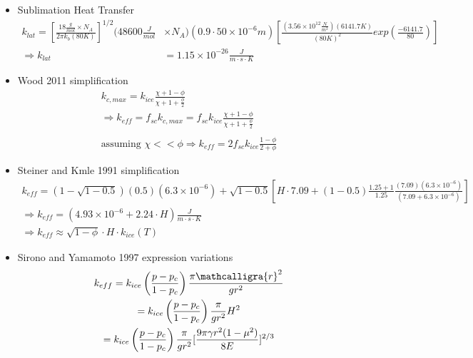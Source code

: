 \documentclass[11pt]{article} %
\newcommand{\sr}{\ensuremath{\mathcalligra{r}} \xspace}
\begin{document}
\begin{itemize}
\begin{itemize}
\item Sublimation Heat Transfer
	\begin{equation}
	\begin{split}
	k_{lat} = [ \frac{18 \frac{g}{mol} \times N_{A}}{2 \pi k_{b} (80K)} ]^{1/2} (48600 \frac{J}{mol} & \times N_{A})(0.9 \cdot 50\times10^{-6} m) [ \frac{(3.56\times 10^{12} \frac{N}{m^{2}})(6141.7 K)}{(80 K)^{2}} exp( \frac{-6141.7}{80} ) ] \\
	\Rightarrow k_{lat} &= 1.15\times10^{-26}\frac{J}{m \cdot s \cdot K}
	\end{split}
	\end{equation}

\item Wood 2011 simplification
	\begin{equation}
	\begin{gathered}
	k_{c,max} = k_{ice} \frac{\chi + 1 - \phi}{\chi + 1 + \frac{\phi}{2}} \\
	\Rightarrow k_{eff} = f_{sc} k_{c,max} = f_{sc} k_{ice} \frac{\chi + 1 - \phi}{\chi + 1 + \frac{\phi}{2}} \\
	\\
	\text{assuming   } \chi << \phi  \Rightarrow k_{eff}=2 f_{sc} k_{ice} \frac{1-\phi}{2+\phi}
	\end{gathered}
	\end{equation}

\item Steiner and Kmle 1991 simplification
	\begin{equation}
	\begin{gathered}
	k_{eff} = (1-\sqrt{1-0.5})(0.5)(6.3\times10^{-6}) + \sqrt{1-0.5} [ H \cdot 7.09+(1-0.5)\frac{1.25+1}{1.25}\frac{(7.09)(6.3\times10^{-6})}{(7.09+6.3\times10^{-6})} ] \\
	\Rightarrow k_{eff} = ( 4.93\times 10^{-6} + 2.24\cdot H )  \frac{J}{m \cdot s \cdot K} \\
	\Rightarrow k_{eff} \approx \sqrt{1-\phi}\cdot H \cdot k_{ice}(T)
	\end{gathered}
	\end{equation}

\item Sirono and Yamamoto 1997 expression variations
	\begin{equation}
	\begin{gathered}
	k_{eff}=k_{ice}\left( \frac{p-p_{c}}{1-p_{c}} \right) \frac{\pi \sr^{2}}{gr^{2}} \\
		 =k_{ice}\left( \frac{p-p_{c}}{1-p_{c}} \right) \frac{\pi}{g r^{2}} H^{2} \\
		 = k_{ice}\left( \frac{p-p_{c}}{1-p_{c}} \right) \frac{\pi}{g r^{2}}[ \frac{9 \pi \gamma r^{2} (1-\mu^{2})}{8 E} ]^{2/3}
	\end{gathered}
	\end{equation}
	

\end{itemize}
\end{itemize}
\end{document}
